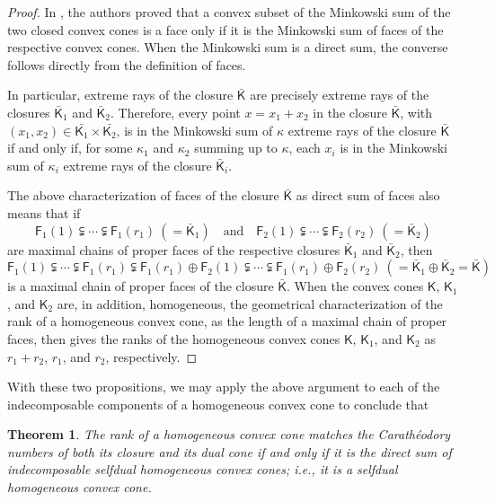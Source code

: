 \documentclass[oneside]{amsart}
\theoremstyle{plain}
\newtheorem{theorem}{Theorem}[section]
\theoremstyle{definition}
\theoremstyle{remark}
\numberwithin{equation}{section}
\begin{document}
\begin{proof}
In \cite[Lemma~3.2]{LouNi26}, the authors proved that a convex subset of
the Minkowski sum of the two closed convex cones is a face only if it is
the Minkowski sum of faces of the respective convex cones. When the
Minkowski sum is a direct sum, the converse follows directly from the
definition of faces.

In particular, extreme rays of the closure $\bar{\mathsf{K}}$ are precisely
extreme rays of the closures $\bar{\mathsf{K}}_{1}$ and
$\bar{\mathsf{K}}_{2}$. Therefore, every point $x = x_{1} + x_{2}$ in the
closure $\bar{\mathsf{K}}$, with $(x_{1}, x_{2}) \in \bar{\mathsf{K}_{1}}
\times \bar{\mathsf{K}_{2}}$, is in the Minkowski sum of $\kappa$ extreme
rays of the closure $\bar{\mathsf{K}}$ if and only if, for some
$\kappa_{1}$ and $\kappa_{2}$ summing up to $\kappa$, each $x_{i}$ is in
the Minkowski sum of $\kappa_i$ extreme rays of the closure
$\bar{\mathsf{K}}_{i}$.

The above characterization of faces of the closure $\bar{\mathsf{K}}$ as
direct sum of faces also means that if
\[
\mathsf{F}_{1}(1) \subsetneqq \dotsb \subsetneqq \mathsf{F}_{1}(r_{1})\ (=
\bar{\mathsf{K}}_{1}) \quad \text{and} \quad \mathsf{F}_{2}(1) \subsetneqq
\dotsb \subsetneqq \mathsf{F}_{2}(r_{2})\ (= \bar{\mathsf{K}}_{2})
\]
are maximal chains of proper faces of the respective closures
$\bar{\mathsf{K}}_{1}$ and $\bar{\mathsf{K}}_{2}$, then
\[
\mathsf{F}_{1}(1) \subsetneqq \dotsb \subsetneqq \mathsf{F}_{1}(r_{1})
\subsetneqq \mathsf{F}_{1}(r_{1}) \oplus \mathsf{F}_{2}(1) \subsetneqq
\dotsb \subsetneqq \mathsf{F}_{1}(r_{1}) \oplus \mathsf{F}_{2}(r_2)\ (=
\bar{\mathsf{K}}_{1} \oplus \bar{\mathsf{K}}_{2} = \bar{\mathsf{K}})
\]
is a maximal chain of proper faces of the closure $\bar{\mathsf{K}}$. When
the convex cones $\mathsf{K}$, $\mathsf{K}_{1}$, and $\mathsf{K}_{2}$ are,
in addition, homogeneous, the geometrical characterization of the rank of a
homogeneous convex cone, as the length of a maximal chain of proper faces,
then gives the ranks of the homogeneous convex cones $\mathsf{K}$,
$\mathsf{K}_{1}$, and $\mathsf{K}_{2}$ as $r_{1} + r_{2}$, $r_{1}$, and
$r_{2}$, respectively.
\end{proof}

With these two propositions, we may apply the above argument to each of
the indecomposable components of a homogeneous convex cone to conclude that

\begin{theorem}\label{theorem:selfdualhomogeneouscone}
The rank of a homogeneous convex cone matches the Carath\'eodory numbers of
both its closure and its dual cone if and only if it is the direct sum of
indecomposable selfdual homogeneous convex cones; i.e., it is a selfdual
homogeneous convex cone.
\end{theorem}
\end{document}
